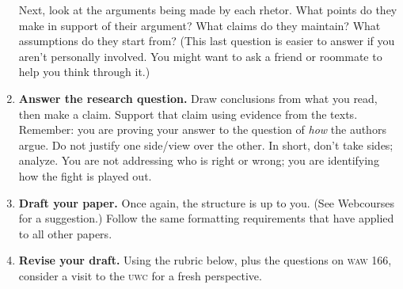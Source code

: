 \documentclass[10pt, twosides]{amsart}	%
\begin{document}
\begin{enumerate}
	Next, look at the arguments being made by each rhetor. What points do they make in support of their argument? What claims do they maintain? What assumptions do they start from? (This last question is easier to answer if you aren't personally involved. You might want to ask a friend or roommate to help you think through it.)
	\item \textbf{Answer the research question.} Draw conclusions from what you read, then make a claim. Support that claim using evidence from the texts. Remember: you are proving your answer to the question of \emph{how} the authors argue. Do not justify one side/view over the other. In short, don't take sides; analyze. You are not addressing who is right or wrong; you are identifying how the fight is played out.
	\item \textbf{Draft your paper.} Once again, the structure is up to you. (See Webcourses for a suggestion.) Follow the same formatting requirements that have applied to all other papers.
\begin{comment}
	\item \textbf{Draft your paper.} Once again, the structure is up to you. This suggested outline is a starting point:
	\begin{description}
		\item[Background] What articles from composition have you read that give you the exigence to write this paper? Position your writing within the relevant thinking of others. Then, briefly (likely 1¶), orient your reader to the issue you've chosen to explore. What do the articles debate? What sort of context encloses them?
		\item[Claim] Identify the disagreement. What are the perspectives, and what do you claim about the rhetors involved? This is where you answer the research question.
		\item[Proof] Support your claim by providing examples from the articles. You will need to employ an organizational method that makes sense based on your analysis.
		\item[Conclusion] Answer ``So what?'' by explaining what you have determined about the assumptions and making of meaning, as well as the construction of texts. Why are those things good to know? (To answer that last question, you need to know your audience. It might be easiest to answer in a political debate.)
	\end{description}%
\end{comment}
	\item \textbf{Revise your draft.} Using the rubric below, plus the questions on \textsc{waw} 166, consider a visit to the \textsc{uwc} for a fresh perspective.
\end{enumerate}
\end{document}
